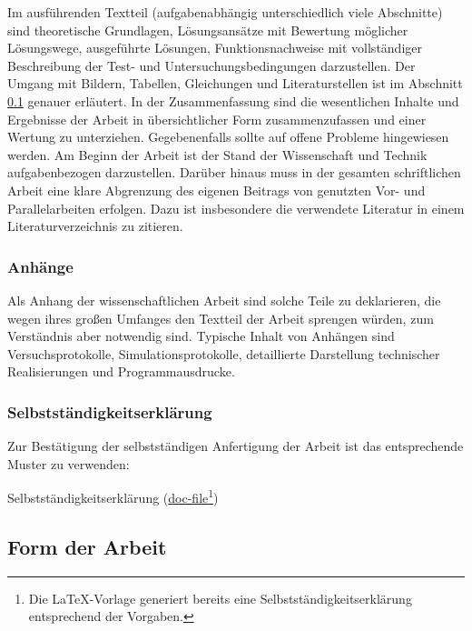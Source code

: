 Im ausführenden Textteil (aufgabenabhängig unterschiedlich viele Abschnitte) sind theoretische Grundlagen, Lösungsansätze mit Bewertung möglicher Lösungswege, ausgeführte Lösungen, Funktionsnachweise mit vollständiger Beschreibung der Test- und Untersuchungsbedingungen darzustellen.
Der Umgang mit Bildern, Tabellen, Gleichungen und Literaturstellen ist im Abschnitt \ref{sec:FormDerArbeit} genauer erläutert.
In der Zusammenfassung sind die wesentlichen Inhalte und Ergebnisse der Arbeit in übersichtlicher Form zusammenzufassen und einer Wertung zu unterziehen. Gegebenenfalls sollte auf offene Probleme hingewiesen werden.
Am Beginn der Arbeit ist der Stand der Wissenschaft und Technik aufgabenbezogen darzustellen. Darüber hinaus muss in der gesamten schriftlichen Arbeit eine klare Abgrenzung des eigenen Beitrags von genutzten Vor- und Parallelarbeiten erfolgen. Dazu ist insbesondere die verwendete Literatur in einem Literaturverzeichnis zu zitieren.


\subsubsection{Anhänge}
\label{sec:Anhaenge}

Als Anhang der wissenschaftlichen Arbeit sind solche Teile zu deklarieren, die wegen ihres großen Umfanges den Textteil der Arbeit sprengen würden, zum Verständnis aber notwendig sind. Typische Inhalt von Anhängen sind Versuchsprotokolle, Simulationsprotokolle, detaillierte Darstellung technischer Realisierungen und Programmausdrucke.

\subsubsection{Selbstständigkeitserklärung}
\label{sec:Selbststaendigkeitserklaerung}

Zur Bestätigung der selbstständigen Anfertigung der Arbeit ist das entsprechende Muster zu verwenden:
\begin{compactitem}
  \item Selbstständigkeitserklärung (\href{http://www.et.tu-dresden.de/ifa/fileadmin/user_upload/www_files/richtlinien_sa_da/DA-SA_Selbststaendigkeit.doc}{doc-file}\footnote{Die LaTeX-Vorlage generiert bereits eine Selbstständigkeitserklärung entsprechend der Vorgaben.})
\end{compactitem}


\subsection{Form der Arbeit}
\label{sec:FormDerArbeit}

